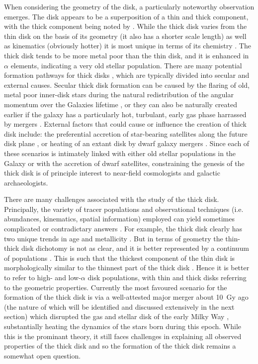 When considering the geometry of the disk, a particularly noteworthy observation emerges. The disk appears to be a superposition of a thin and thick component, with the thick component being noted by \textcite{gilmore83}. While the thick disk varies from the thin disk on the basis of its geometry (it also has a shorter scale length) as well as kinematics (obviously hotter) it is most unique in terms of its chemistry \textcite{gilmore95,bensby14}. The thick disk tends to be more metal poor than the thin disk, and it is enhanced in $\alpha$ elements, indicating a very old stellar population. There are many potential formation pathways for thick disks \parencite[e.g. see][]{robin14,minchev15}, which are typically divided into secular and external causes. Secular thick disk formation can be caused by the flaring of old, metal poor inner-disk stars during the natural redistribution of the angular momentum over the Galaxies lifetime \parencite{schoenrich09}, or they can also be naturally created earlier if the galaxy has a particularly hot, turbulant, early gas phase harrassed by mergers \parencite{brook04}. External factors that could cause or influence the creation of thick disk include: the preferential accretion of star-bearing satellites along the future disk plane \parencite{abadi03}, or heating of an extant disk by dwarf galaxy mergers \parencite{quinn93}. Since each of these scenarios is intimately linked with either old stellar populations in the Galaxy or with the accretion of dwarf satellites, constraining the genesis of the thick disk is of principle interest to near-field cosmologists and galactic archaeologists.

There are many challenges associated with the study of the thick disk. Principally, the variety of tracer populations and observational techniques (i.e. abundances, kinematics, spatial information) employed can yield sometimes complicated or contradictary answers \parencite{minchev15,kawata16}. For example, the thick disk clearly has two unique trends in age and metallicity \parencite{haywood13,hayden15}. But in terms of geometry the thin-thick disk dichotomy is not as clear, and it is better represented by a continuum of populations \parencite{bovy12e,bovy16b}. This is such that the thickest component of the thin disk is morphologically similar to the thinnest part of the thick disk \parencite{hayden17}. Hence it is better to refer to high- and low-$\alpha$ disk populations, with thin and thick disks referring to the geometric properties. Currently the most favoured scenario for the formation of the thick disk is via a well-attested major merger about 10~Gy ago (the nature of which will be identified and discussed extensively in the next section) which disrupted the gas and stellar disk of the early Milky Way \parencite{gallart19,belokurov20}, substantially heating the dynamics of the stars born during this epoch. While this is the prominant theory, it still faces challenges in explaining all observed properties of the thick disk and so the formation of the thick disk remains a somewhat open question.

